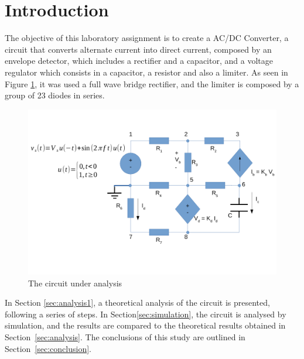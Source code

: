 \section{Introduction}
\label{sec:introduction}

The objective of this laboratory assignment is to create a AC/DC Converter, a circuit that converts alternate current
into direct current, composed by an envelope detector, which includes a rectifier and a capacitor, and a voltage regulator which consists in a capacitor, a resistor and also a limiter. As seen in Figure \ref{fig:rc}, it was used a full wave bridge rectifier, and the limiter is composed by a group of 23 diodes in series.

\begin{figure}[h] \centering
\includegraphics[width=0.8\linewidth]{rc.pdf}
\caption{The circuit under analysis}
\label{fig:rc}
\end{figure}

In Section \ref{sec:analysis1}, a theoretical analysis of the circuit is
presented, following a series of steps. In Section\ref{sec:simulation}, the circuit is analysed by
simulation, and the results are compared to the theoretical results obtained in
Section~\ref{sec:analysis}. The conclusions of this study are outlined in
Section~\ref{sec:conclusion}.





